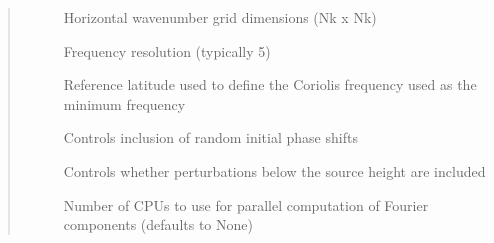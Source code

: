 \documentclass[letterpaper,10pt,english]{sphinxmanual}
\begin{document}
\begin{fulllineitems}
\begin{quote}
\begin{description}
\begin{description}
\item[{}] \leavevmode
\sphinxAtStartPar
Horizontal wavenumber grid dimensions (Nk x Nk)

\item[{}] \leavevmode
\sphinxAtStartPar
Frequency resolution (typically 5)

\item[{}] \leavevmode
\sphinxAtStartPar
Reference latitude used to define the Coriolis frequency used as the minimum frequency

\item[{}] \leavevmode
\sphinxAtStartPar
Controls inclusion of random initial phase shifts

\item[{}] \leavevmode
\sphinxAtStartPar
Controls whether perturbations below the source height are included

\item[{}] \leavevmode
\sphinxAtStartPar
Number of CPUs to use for parallel computation of Fourier components (defaults to None)

\end{description}

\end{description}\end{quote}

\end{fulllineitems}

\end{document}
